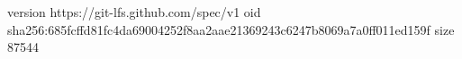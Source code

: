 version https://git-lfs.github.com/spec/v1
oid sha256:685fcffd81fc4da69004252f8aa2aae21369243c6247b8069a7a0ff011ed159f
size 87544
